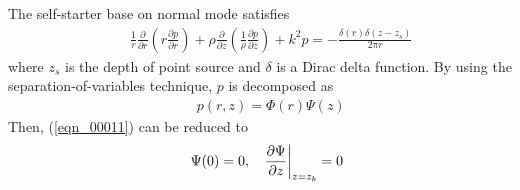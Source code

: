 \documentclass[journal,onecolumn]{IEEEtran}
\begin{document}
The self-starter base on normal mode satisfies \cite{COA}
\begin{eqnarray}
&&\frac{1}{r} \frac{\partial }{\partial r} \left(r \frac{\partial p}{\partial r} \right) 
+ \rho \frac{\partial }{\partial z} \left( \frac{1}{\rho} \frac{\partial p}{\partial z} \right) 
+ k^2  p = - \frac{\delta (r) \delta(z - z_s)}{2 \pi r}
\label{SS_0001}
\end{eqnarray}
where $z_s$ is the depth of point source and $\delta$ is a Dirac delta function.
By using the separation-of-variables technique, $p$ is decomposed as
\begin{eqnarray}
&&p(r, z) = \Phi(r) \Psi(z) 
\label{SS_0002} 
\end{eqnarray}
Then, (\ref{eqn_00011}) can be reduced to
\begin{eqnarray}
&&\Psi(0) = 0, \hspace{0.3 cm} \left. \frac{\partial \Psi}{\partial z} \right|_{z = z_b} = 0
\label{SS_0003}  
\end{eqnarray}
\end{document}
